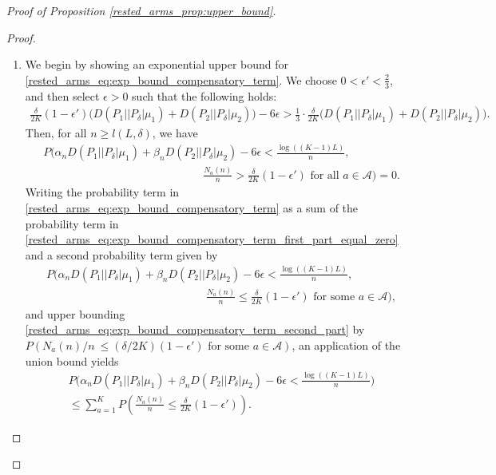 \begin{proof}[Proof of Proposition \ref{rested_arms_prop:upper_bound}]
\begin{proof}
\begin{enumerate}
\item We begin by showing an exponential upper bound for \eqref{rested_arms_eq:exp_bound_compensatory_term}. We choose $0<\epsilon'<\frac{2}{3}$, and then select $\epsilon>0$ such that the following holds:
\begingroup\allowdisplaybreaks\begin{align}
	\frac{\delta}{2K}(1-\epsilon')\bigg(D(P_1||P_\delta|\mu_1)+D(P_2||P_\delta|\mu_2)\bigg)-6\epsilon
	>\frac{1}{3}\cdot\frac{\delta}{2K}\bigg(D(P_1||P_\delta|\mu_1)+D(P_2||P_\delta|\mu_2)\bigg).\label{rested_arms_eq:select_epsilon'}
\end{align}\endgroup
Then, for all $n\geq l(L,\delta)$,
we have
\begingroup\allowdisplaybreaks\begin{align}
	&P\bigg(\alpha_n D(P_1||P_\delta|\mu_1)+\beta_n D(P_2||P_\delta|\mu_2)-6\epsilon
	<\frac{\log((K-1)L)}{n},\nonumber\\
	&\hspace{6cm}\frac{N_a(n)}{n}>\frac{\delta}{2K}(1-\epsilon')\text{ for all }a\in\mathcal{A}\bigg)=0.\label{rested_arms_eq:exp_bound_compensatory_term_first_part_equal_zero}
\end{align}\endgroup
Writing the probability term in \eqref{rested_arms_eq:exp_bound_compensatory_term} as a sum of the probability term in \eqref{rested_arms_eq:exp_bound_compensatory_term_first_part_equal_zero} and a second probability term given by
\begin{align}
	& P\bigg(\alpha_n D(P_1||P_\delta|\mu_1)+\beta_n D(P_2||P_\delta|\mu_2)-6\epsilon
	<\frac{\log((K-1)L)}{n},\nonumber\\
	&\hspace{6cm}\frac{N_a(n)}{n}\leq\frac{\delta}{2K}(1-\epsilon')\text{ for some }a\in\mathcal{A}\bigg),\label{rested_arms_eq:exp_bound_compensatory_term_second_part}
\end{align}
and upper bounding \eqref{rested_arms_eq:exp_bound_compensatory_term_second_part} by $P(N_a(n)/n~\leq (\delta/2K)(1-\epsilon')\text{ for some }a\in\mathcal{A})$, an application of the union bound yields
\begingroup\allowdisplaybreaks\begin{align}
	&P\bigg(\alpha_n D(P_1||P_\delta|\mu_1)+\beta_n D(P_2||P_\delta|\mu_2)-6\epsilon
	<\frac{\log((K-1)L)}{n}\bigg)\nonumber\\
	&\leq \sum\limits_{a=1}^{K} P\left(\frac{N_a(n)}{n}\leq\frac{\delta}{2K}(1-\epsilon')\right).\label{rested_arms_eq:exp_bound_correction_term_temp_1}
\end{align}\endgroup	

\end{enumerate}
\end{proof}
\end{proof}
